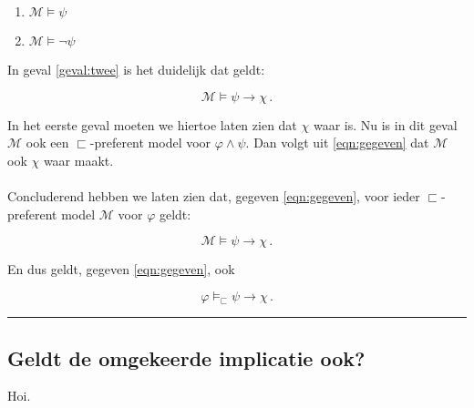\documentclass[a4paper,11pt]{article}
\begin{document}
\begin{enumerate}
\item\label{geval:een} $\mathcal{M} \vDash \psi$
\item\label{geval:twee} $\mathcal{M} \vDash \neg \psi$
\end{enumerate}

In geval \ref{geval:twee} is het duidelijk dat geldt:

\begin{displaymath}
\mathcal{M} \vDash \psi \rightarrow \chi \, \mbox{.}
\end{displaymath}

In het eerste geval moeten we hiertoe laten zien dat $\chi$ waar is. Nu is in
dit geval $\mathcal{M}$ ook een $\sqsubset$-preferent model voor $\varphi
\wedge \psi$. Dan volgt uit \ref{eqn:gegeven} dat $\mathcal{M}$ ook $\chi$
waar maakt.

\paragraph{}

Concluderend hebben we laten zien dat, gegeven \ref{eqn:gegeven}, voor ieder
$\sqsubset$-preferent model $\mathcal{M}$ voor $\varphi$ geldt:

\begin{displaymath}
\mathcal{M} \vDash \psi \rightarrow \chi \, \mbox{.}
\end{displaymath}

En dus geldt, gegeven \ref{eqn:gegeven}, ook

\begin{displaymath}
\varphi \vDash_{\sqsubset} \psi \rightarrow \chi \, \mbox{.}
\end{displaymath}

\hfill\rule{2.1mm}{2.mm}


\subsection*{Geldt de omgekeerde implicatie ook?}

Hoi.
\end{document}
